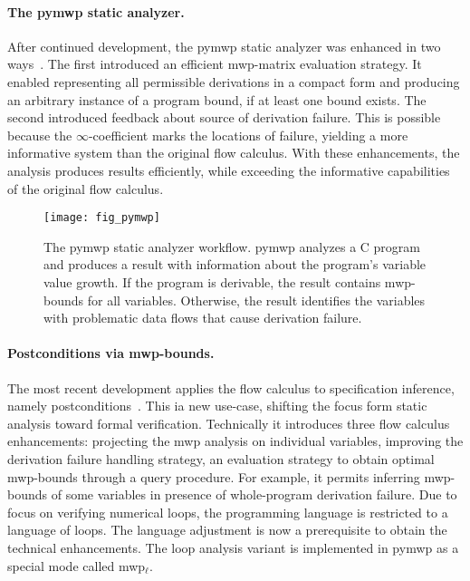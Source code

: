 \paragraph*{The pymwp static analyzer.}
After continued development, the pymwp static analyzer was enhanced in two ways~\cite{aubert2023b}.
The first introduced an efficient mwp-matrix evaluation strategy.
It enabled representing all permissible derivations in a compact form and producing an arbitrary instance of a program bound, if at least one bound exists.
The second introduced feedback about source of derivation failure.
This is possible because the \(\infty\)-coefficient marks the locations of failure, yielding a more informative system than the original flow calculus.
With these enhancements, the analysis produces results efficiently,
while exceeding the informative capabilities of the original flow calculus.

\begin{figure}[t]
\centering
\texttt{[image: fig\_pymwp]}
\caption[The pymwp static analyzer workflow]{
The pymwp static analyzer workflow.
pymwp analyzes a C program
and produces a result with information about the program's variable value growth.
If the program is derivable, the result contains mwp-bounds for all variables.
Otherwise, the result identifies the variables with problematic data flows that cause derivation failure.
}\label{fig:pymwp}
\end{figure}

\paragraph*{Postconditions via mwp-bounds.}
The most recent development applies the flow calculus to specification inference, namely postconditions~\cite{rusch2025}.
This ia new use-case, shifting the focus form static analysis toward formal verification.
Technically it introduces three flow calculus enhancements:
projecting the mwp analysis on individual variables, improving the derivation failure handling strategy, an evaluation strategy to obtain optimal mwp-bounds through a query procedure.
For example, it permits inferring mwp-bounds of some variables in presence of whole-program derivation failure.
Due to focus on verifying numerical loops, the programming language is restricted to a language of loops.
The language adjustment is now a prerequisite to obtain the technical enhancements.
The loop analysis variant is implemented in pymwp as a special mode called mwp\(_\ell\).

